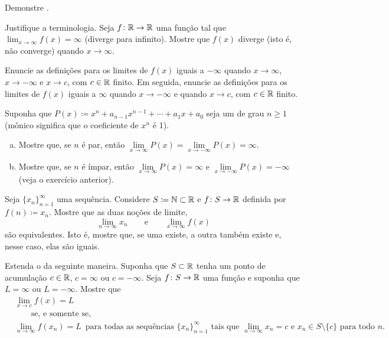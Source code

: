 \begin{exercise}
Demonstre .
\end{exercise}

\begin{exercise}
Justifique a terminologia.
Seja $f \colon {\mathbb{R}} \to {\mathbb{R}}$ uma função tal que
$\lim_{x \to \infty} f(x) = \infty$ (diverge para infinito).
Mostre que $f(x)$ diverge (isto é, não converge) quando $x \to \infty$.
\end{exercise}

\begin{exercise}
Enuncie as definições para os limites de $f(x)$ iguais a $-\infty$ quando $x \to
\infty$, $x \to -\infty$ e $x \to c$, com $c \in {\mathbb{R}}$ finito.
Em seguida, enuncie as definições para os limites de $f(x)$ iguais a $\infty$
quando $x \to -\infty$ e quando $x \to c$, com $c \in {\mathbb{R}}$ finito.
\end{exercise}

\begin{exercise}
Suponha que $P(x) \coloneqq x^n + a_{n-1} x^{n-1} + \cdots + a_1 x + a_0$ seja um \emph{}
de grau $n \geq 1$ (mônico significa que o coeficiente de $x^n$ é 1).
\begin{enumerate}[a)]
\item
Mostre que, se $n$ é par, então $\lim\limits_{x\to\infty} P(x) =
\lim\limits_{x\to-\infty} P(x) = \infty$.
\item
Mostre que, se $n$ é ímpar, então
$\lim\limits_{x\to\infty} P(x) = \infty$ e
$\lim\limits_{x\to-\infty} P(x) = -\infty$ (veja o exercício anterior).
\end{enumerate}
\end{exercise}

\begin{exercise}
Seja $\{ x_n \}_{n=1}^\infty$ uma sequência. Considere $S \coloneqq {\mathbb{N}} \subset {\mathbb{R}}$ e
$f \colon S \to {\mathbb{R}}$ definida por $f(n) \coloneqq x_n$. Mostre que as duas noções de limite,
\begin{equation*}
\lim_{n\to\infty} x_n \qquad \text{e} \qquad
\lim_{x\to\infty} f(x)
\end{equation*}
são equivalentes. Isto é, mostre que, se uma existe, a outra também existe
e, nesse caso, elas são iguais.
\end{exercise}

\begin{exercise}
Estenda o  da seguinte maneira.
Suponha que $S \subset {\mathbb{R}}$ tenha um ponto de acumulação $c \in {\mathbb{R}}$, $c = \infty$
ou $c = -\infty$. Seja $f \colon S \to {\mathbb{R}}$ uma função e suponha que
$L = \infty$ ou $L = -\infty$. Mostre que
\begin{equation*}
\begin{aligned}
&
\lim_{x\to c} f(x) = L
\\
&
\qquad \text{se, e somente se,} \qquad
\\
&
\lim_{n\to\infty} f(x_n) = L \enspace \text{para todas as sequências }
\{ x_n \}_{n=1}^\infty \text{ tais que } \lim_{n\to\infty} x_n = c
\text{ e } x_n \in S \setminus \{c\}
\text{ para todo } n .
\end{aligned}
\end{equation*}
\end{exercise}

